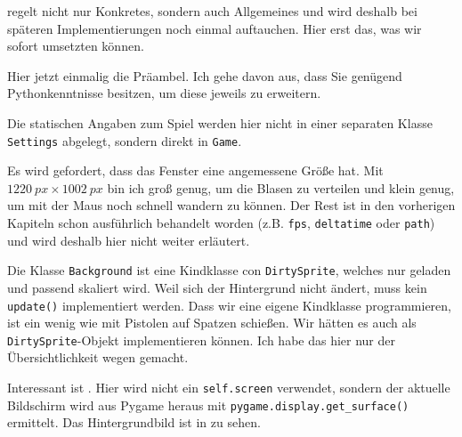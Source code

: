  regelt nicht nur Konkretes, sondern auch Allgemeines und wird deshalb bei späteren Implementierungen noch einmal auftauchen. Hier erst das, was wir sofort umsetzten können.

Hier jetzt einmalig die Präambel. Ich gehe davon aus, dass Sie genügend Pythonkenntnisse besitzen, um diese jeweils zu erweitern.


Die statischen Angaben zum Spiel werden hier nicht in einer separaten Klasse \texttt{Settings} abgelegt, sondern direkt in \texttt{Game}.


Es wird gefordert, dass das Fenster eine angemessene Größe hat. Mit $1220~px \times 1002~px$ bin ich groß genug, um die Blasen zu verteilen und klein genug, um mit der Maus noch schnell wandern zu können. Der Rest ist in den vorherigen Kapiteln schon ausführlich behandelt worden (z.B. \texttt{fps}, \texttt{deltatime} oder \texttt{path}) und wird deshalb hier nicht weiter erläutert.


Die Klasse \texttt{Background} ist eine Kindklasse con \texttt{DirtySprite}, welches nur geladen und passend skaliert wird. Weil sich der Hintergrund nicht ändert, muss kein \texttt{update()} implementiert werden. Dass wir eine eigene Kindklasse programmieren, ist ein wenig wie mit Pistolen auf Spatzen schießen. Wir hätten es auch als \texttt{DirtySprite}-Objekt implementieren können. Ich habe das hier nur der Übersichtlichkeit wegen gemacht. 

Interessant ist . Hier wird nicht ein \texttt{self.screen} verwendet, sondern der aktuelle Bildschirm wird aus Pygame heraus mit \texttt{pygame.display.get\_surface()} ermittelt. Das Hintergrundbild ist in  zu sehen.


